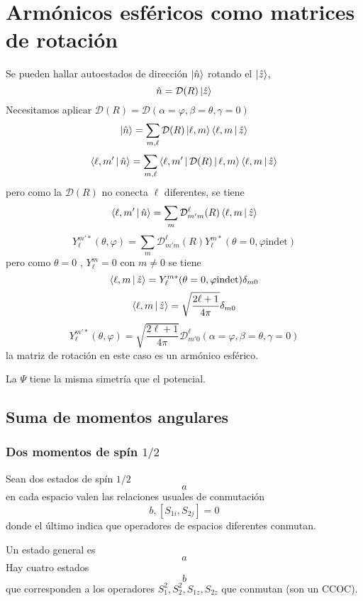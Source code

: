 \documentclass[10pt,oneside]{CBFT_book}
\begin{document}
\chapter{Armónicos esféricos como matrices de rotación}
Se pueden hallar autoestados de dirección $\Ket{\hat{n}}$ rotando el $\Ket{\hat{z}}$,
\[
	\hat{n} = \mathcal{D}(R) \Ket{\hat{z}}
\]
Necesitamos aplicar $\mathcal{D}(R)=\mathcal{D}(\alpha=\varphi,\beta=\theta,\gamma=0)$
\[
	\Ket{\hat{n}} = \sum_{m,\ell} \mathcal{D} (R) \Ket{\ell,m}\Braket{\ell,m|\hat{z}}
\]
\[
	\Braket{\ell,m'|\hat{n}} = \sum_{m,\ell} \Braket{\ell,m'|\mathcal{D} (R)| \ell,m}\Braket{\ell,m|\hat{z}}
\]
pero como la $\mathcal{D}(R)$ no conecta $\ell$ diferentes, se tiene 
\[
	\Braket{\ell,m'|\hat{n}} = \sum_{m} \mathcal{D}_{m'm}^\ell(R) \Braket{\ell,m|\hat{z}}	
\]
\[
	Y_\ell^{m'*}(\theta,\varphi) = \sum_m \mathcal{D}_{m'm}^\ell(R) Y_\ell^{m*} (\theta=0,\varphi \text{indet})
\]
pero como $\theta=0$ , $Y_\ell^m = 0$  con $m\neq 0$ se tiene 
\[
	\Braket{\ell,m|\hat{z}} = Y_\ell^{m*} (\theta=0,\varphi \text{indet}) \delta_{m0}
\]
\[
	\Braket{\ell,m|\hat{z}} = \sqrt{ \frac{2\ell +1}{4\pi} } \delta_{m0}
\]
\[
	Y_\ell^{m'*}(\theta,\varphi) = \sqrt{ \frac{2\ell +1}{4\pi} }
	\mathcal{D}_{m'0}^\ell (\alpha=\varphi,\beta=\theta,\gamma=0)
\]
la matriz de rotación en este caso es un armónico esférico.

La $\Psi$ tiene la misma simetría que el potencial.

\section{Suma de momentos angulares}

\subsection{Dos momentos de spín $1/2$}

Sean dos estados de spín $1/2$
\[
	a
\]
en cada espacio valen las relaciones usuales de conmutación 
\[
	b, [S_{1i},S_{2j}] = 0
\]
donde el último indica que operadores de espacios diferentes conmutan.

Un estado general es 
\[
	a
\]
Hay cuatro estados
\[
	b
\]
que corresponden a los operadores $S_ 1^2, S_2^2, S_{1z}, S_{2z}$ que conmutan (son un CCOC).
\end{document}

